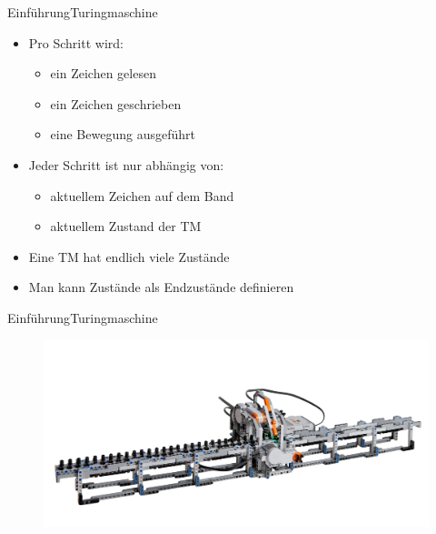 \documentclass[ignorenonframetext,]{beamer}
\begin{document}
\begin{frame}{Einführung}{Turingmaschine}

\begin{itemize}
\itemsep1pt\parskip0pt
\item
  Pro Schritt wird:

  \begin{itemize}
  \itemsep1pt\parskip0pt
  \item
    ein Zeichen gelesen
  \item
    ein Zeichen geschrieben
  \item
    eine Bewegung ausgeführt
  \end{itemize}
\item
  Jeder Schritt ist nur abhängig von:

  \begin{itemize}
  \itemsep1pt\parskip0pt
  \item
    aktuellem Zeichen auf dem Band
  \item
    aktuellem Zustand der TM
  \end{itemize}
\item
  Eine TM hat endlich viele Zustände
\item
  Man kann Zustände als Endzustände definieren
\end{itemize}

\end{frame}

\begin{frame}{Einführung}{Turingmaschine}

\begin{figure}[htbp]
\centering
\includegraphics{img/lego_tm.png}

\end{figure}

\end{frame}
\end{document}
